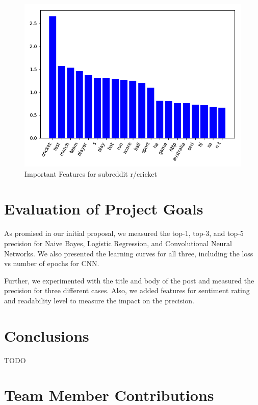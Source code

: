 \documentclass{sig-alternate-05-2015}
\begin{document}
\begin{figure}[H]
\centering
\includegraphics[width=\linewidth]{plots/coefficients-cricket-dim-200.png}
\caption{Important Features for subreddit r/cricket}
\end{figure}

\section{Evaluation of Project Goals}

As promised in our initial proposal, we measured the top-1, top-3, and top-5 precision for Naive Bayes, Logistic Regression, and Convolutional Neural Networks. We also presented the learning curves for all three, including the loss vs number of epochs for CNN.

Further, we experimented with the title and body of the post and measured the precision for three different cases. Also, we added features for sentiment rating and readability level to measure the impact on the precision.

\section{Conclusions}

TODO

\section{Team Member Contributions}


%

%
\end{document}
